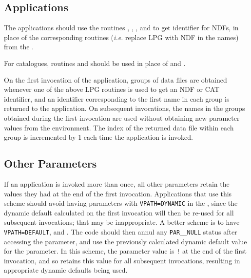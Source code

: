 \documentclass[twoside,11pt]{starlink}
\begin{document}
\subsection{Applications}

The applications should use the routines ,
, ,
and \latex{\linebreak} to get identifier for NDFs, in
place of the corresponding routines (\emph{i.e.} replace LPG with NDF in
the names) from the .

For catalogues, routines  and
 should be
used in place of  and
.

On the first invocation of the application, groups of data files are
obtained whenever one of the above LPG routines is used to get an NDF
or CAT identifier, and an identifier corresponding to the first name in
each group is returned to the application.  On subsequent invocations,
the names in the groups obtained during the first invocation are used
without obtaining new parameter values from the environment.  The
index of the returned data file within each group is incremented by 1
each time the application is invoked.

\subsection{Other Parameters}

If an application is invoked more than once, all other parameters
retain the values they had at the end of the first invocation.
Applications that use this scheme should avoid having parameters with
\texttt{VPATH=DYNAMIC} in the , since
the dynamic default calculated on the first invocation will then be
re-used for all subsequent invocations; that may be inappropriate.  A
better scheme is to have \texttt{VPATH=DEFAULT},  and .  The code should then annul
any \texttt{PAR\_\_NULL} status after accessing the parameter, and use
the previously calculated dynamic default value for the parameter.  In
this scheme, the parameter value is \texttt{!} at the end of the first
invocation, and so retains this value for all subsequent invocations,
resulting in appropriate dynamic defaults being used.
\end{document}
